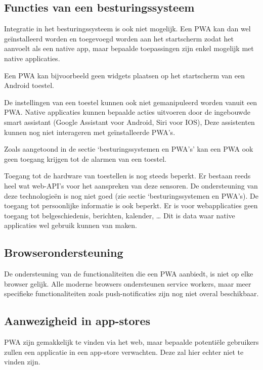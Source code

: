 	
\subsection{Functies van een besturingssysteem}

	Integratie in het besturingssysteem is ook niet mogelijk. Een PWA kan dan wel geïnstalleerd worden en toegevoegd worden aan het startscherm zodat het aanvoelt als een native app, maar bepaalde toepassingen zijn enkel mogelijk met native applicaties.
	
	Een PWA kan bijvoorbeeld geen widgets plaatsen op het startscherm van een Android toestel. 
	
	De instellingen van een toestel kunnen ook niet gemanipuleerd worden vanuit een PWA. Native applicaties kunnen bepaalde acties uitvoeren door de ingebouwde smart assistant (Google Assistant voor Android, Siri voor IOS), Deze assistenten kunnen nog niet interageren met geïnstalleerde PWA’s.
	
	Zoals aangetoond in de sectie ‘besturingssystemen en PWA’s’ kan een PWA ook geen toegang krijgen tot de alarmen van een toestel.
	
	Toegang tot de hardware van toestellen is nog steeds beperkt. Er bestaan reeds heel wat web-API’s voor het aanspreken van deze sensoren. De ondersteuning van deze technologieën is nog niet goed (zie sectie ‘besturingssystemen en PWA’s).
	De toegang tot persoonlijke informatie is ook beperkt. Er is voor webapplicaties geen toegang tot belgeschiedenis, berichten, kalender, … Dit is data waar native applicaties wel gebruik kunnen van maken.
	
	\autocite{Brousek2017}
	
\subsection{Browserondersteuning}

	De ondersteuning van de functionaliteiten die een PWA aanbiedt, is niet op elke browser gelijk. Alle moderne browsers ondersteunen service workers, maar meer specifieke functionaliteiten zoals push-notificaties zijn nog niet overal beschikbaar.
	
	
\subsection{Aanwezigheid in app-stores}
	PWA zijn gemakkelijk te vinden via het web, maar bepaalde potentiële gebruikers zullen een applicatie in een app-store verwachten. Deze zal hier echter niet te vinden zijn.
	
